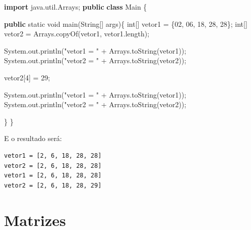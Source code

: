 \documentclass[
]{book}
\newenvironment{Shaded}{\begin{snugshade}}{\end{snugshade}}
\newcommand{\BaseNTok}[1]{\textcolor[rgb]{0.00,0.00,0.81}{#1}}
\newcommand{\BuiltInTok}[1]{#1}
\newcommand{\DataTypeTok}[1]{\textcolor[rgb]{0.13,0.29,0.53}{#1}}
\newcommand{\DecValTok}[1]{\textcolor[rgb]{0.00,0.00,0.81}{#1}}
\newcommand{\FunctionTok}[1]{\textcolor[rgb]{0.00,0.00,0.00}{#1}}
\newcommand{\ImportTok}[1]{#1}
\newcommand{\KeywordTok}[1]{\textcolor[rgb]{0.13,0.29,0.53}{\textbf{#1}}}
\newcommand{\NormalTok}[1]{#1}
\newcommand{\StringTok}[1]{\textcolor[rgb]{0.31,0.60,0.02}{#1}}
\begin{document}
\begin{Shaded}
\begin{Highlighting}[]
\KeywordTok{import}\ImportTok{ java.util.Arrays;}
\KeywordTok{public} \KeywordTok{class}\NormalTok{ Main \{}

    \KeywordTok{public} \DataTypeTok{static} \DataTypeTok{void} \FunctionTok{main}\NormalTok{(}\BuiltInTok{String}\NormalTok{[] args)\{}
        \DataTypeTok{int}\NormalTok{[] vetor1 = \{}\BaseNTok{02}\NormalTok{, }\BaseNTok{06}\NormalTok{, }\DecValTok{18}\NormalTok{, }\DecValTok{28}\NormalTok{, }\DecValTok{28}\NormalTok{\};}
        \DataTypeTok{int}\NormalTok{[] vetor2 = }\BuiltInTok{Arrays}\NormalTok{.}\FunctionTok{copyOf}\NormalTok{(vetor1, vetor1.}\FunctionTok{length}\NormalTok{);}

        \BuiltInTok{System}\NormalTok{.}\FunctionTok{out}\NormalTok{.}\FunctionTok{println}\NormalTok{(}\StringTok{"vetor1 = "}\NormalTok{ + }\BuiltInTok{Arrays}\NormalTok{.}\FunctionTok{toString}\NormalTok{(vetor1));}
        \BuiltInTok{System}\NormalTok{.}\FunctionTok{out}\NormalTok{.}\FunctionTok{println}\NormalTok{(}\StringTok{"vetor2 = "}\NormalTok{ + }\BuiltInTok{Arrays}\NormalTok{.}\FunctionTok{toString}\NormalTok{(vetor2));}

\NormalTok{        vetor2[}\DecValTok{4}\NormalTok{] = }\DecValTok{29}\NormalTok{;}

        \BuiltInTok{System}\NormalTok{.}\FunctionTok{out}\NormalTok{.}\FunctionTok{println}\NormalTok{(}\StringTok{"vetor1 = "}\NormalTok{ + }\BuiltInTok{Arrays}\NormalTok{.}\FunctionTok{toString}\NormalTok{(vetor1));}
        \BuiltInTok{System}\NormalTok{.}\FunctionTok{out}\NormalTok{.}\FunctionTok{println}\NormalTok{(}\StringTok{"vetor2 = "}\NormalTok{ + }\BuiltInTok{Arrays}\NormalTok{.}\FunctionTok{toString}\NormalTok{(vetor2));}
        
\NormalTok{    \}}
\NormalTok{\}}
\end{Highlighting}
\end{Shaded}

E o resultado será:

\begin{verbatim}
vetor1 = [2, 6, 18, 28, 28]
vetor2 = [2, 6, 18, 28, 28]
vetor1 = [2, 6, 18, 28, 28]
vetor2 = [2, 6, 18, 28, 29]
\end{verbatim}

\hypertarget{matrizes}{%
\section{Matrizes}\label{matrizes}}
\end{document}
